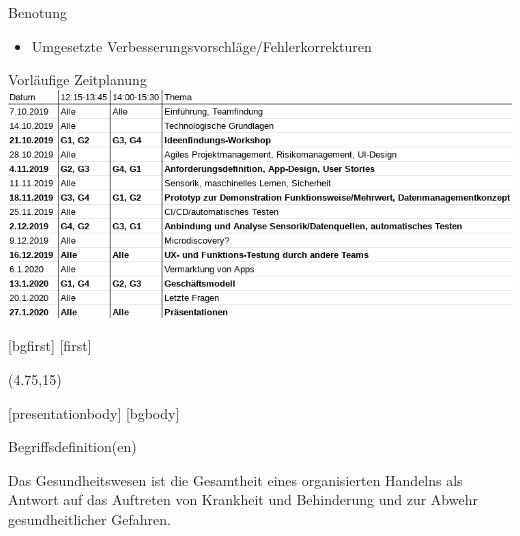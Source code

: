 \begin{frame}{Benotung}
\begin{itemize}
        \item<6-> Umgesetzte Verbesserungsvorschläge/Fehlerkorrekturen
    \end{itemize}
\end{frame}

\begin{frame}{Vorläufige Zeitplanung}
    \includegraphics[width=\textwidth]{Bilder/Zeitplan.png}
\end{frame}

[bgfirst]
[first]
\subtitle{\theslidesection: Kurzer Einblick in das Gesundheitssystem}
\begin{frame}[noframenumbering]
\titlepage
\begin{textblock}{10}(4.75,15)
\cite{GesundheitssystemLogo}
\end{textblock}
\end{frame}
[presentationbody] 
[bgbody]

\begin{frame}{Begriffsdefinition(en)}
    \begin{definition}
        Das Gesundheitswesen ist die Gesamtheit eines organisierten Handelns als Antwort auf das Auftreten von Krankheit und Behinderung und zur Abwehr gesundheitlicher Gefahren.
    \end{definition}
\end{frame}

